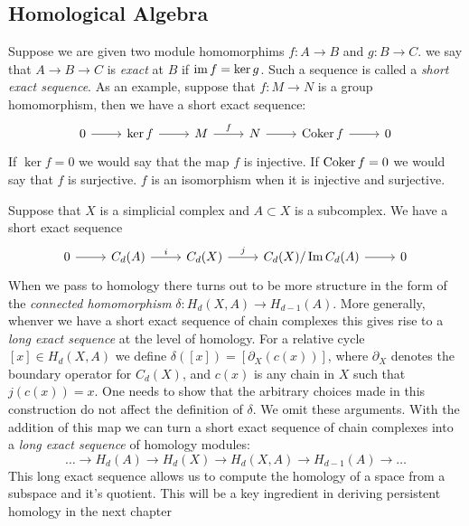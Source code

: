 \subsection{Homological Algebra} 
Suppose we are given two module homomorphims $f: A \rightarrow B$ and $g: B \rightarrow C$. we say that $A \rightarrow B \rightarrow C$
is \emph{exact} at $B$ if $\operatorname{im}{f} =  \ker{g}$. Such a sequence is called a \emph{short exact sequence}. As an example, suppose that $f: M \rightarrow N$ is a group homomorphism, then we have a short exact sequence:
\[ 
\begin{tikzcd}
0 \arrow{r} & \ker{f} \arrow{r} & M \arrow{r}{f} & N \arrow{r} & \coker{f} \arrow{r}& 0
\end{tikzcd}
\] 
If $\ker{f} = 0$ we would say that the map $f$ is injective. If $\operatorname{Coker}{f} = 0$ we would say that $f$ is surjective. $f$ is an isomorphism when it is injective and surjective. 

Suppose that $X$ is a simplicial complex and $A \subset X$ is a subcomplex. We have a short exact sequence 
\[
\begin{tikzcd}
0 \arrow{r}& C_d(A) \arrow{r}{i} & C_d(X) \arrow{r}{j} & C_d(X)/\Im{C_d(A)} \arrow{r} & 0 
\end{tikzcd}
\]
When we pass to homology there turns out to be more structure in the form of the \emph{connected homomorphism}  $\delta: H_d(X,A) \rightarrow H_{d-1}(A)$. More generally, whenver we have a short exact sequence of chain complexes this gives rise to a \emph{long exact sequence} at the level of homology. 
 For a relative cycle $[x] \in H_d(X,A)$ we define $\delta([x]) = [\partial_X(c(x))]$, where $\partial_X$ denotes the boundary operator for $C_d(X)$, and $c(x)$ is any chain in $X$ such that $j(c(x)) = x$. One needs to show that the arbitrary choices made in this construction do not affect the definition of $\delta$. We omit these arguments. 
 With the addition of this map we can turn a short exact sequence of chain complexes into a \emph{long exact sequence} of homology modules:
\[ \ldots \rightarrow H_d(A) \rightarrow H_d(X) \rightarrow H_d(X,A) \rightarrow H_{d-1}(A) \rightarrow \ldots \]
This long exact sequence allows us to compute the homology of a space from a subspace and it's quotient. This will be a key ingredient in deriving persistent homology in the next chapter